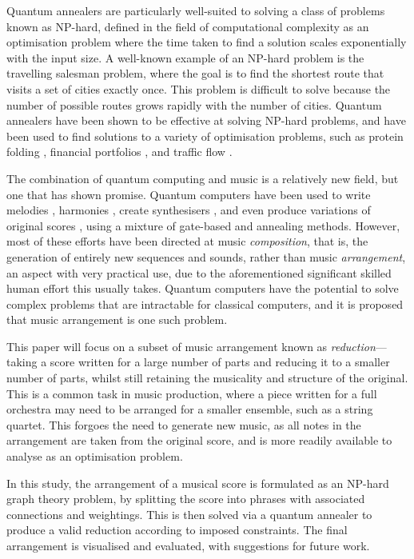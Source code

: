 \documentclass[12pt]{article}
\begin{document}
Quantum annealers are particularly well-suited to solving a class of problems known as NP-hard, defined in the field of computational complexity as an optimisation problem where the time taken to find a solution scales exponentially with the input size. A well-known example of an NP-hard problem is the travelling salesman problem, where the goal is to find the shortest route that visits a set of cities exactly once. This problem is difficult to solve because the number of possible routes grows rapidly with the number of cities. Quantum annealers have been shown to be effective at solving NP-hard problems, and have been used to find solutions to a variety of optimisation problems, such as protein folding , financial portfolios , and traffic flow .

The combination of quantum computing and music is a relatively new field, but one that has shown promise. Quantum computers have been used to write melodies , harmonies , create synthesisers , and even produce variations of original scores , using a mixture of gate-based and annealing methods. However, most of these efforts have been directed at music \textit{composition}, that is, the generation of entirely new sequences and sounds, rather than music \textit{arrangement}, an aspect with very practical use, due to the aforementioned significant skilled human effort this usually takes. Quantum computers have the potential to solve complex problems that are intractable for classical computers, and it is proposed that music arrangement is one such problem.

This paper will focus on a subset of music arrangement known as \textit{reduction}—taking a score written for a large number of parts and reducing it to a smaller number of parts, whilst still retaining the musicality and structure of the original. This is a common task in music production, where a piece written for a full orchestra may need to be arranged for a smaller ensemble, such as a string quartet. This forgoes the need to generate new music, as all notes in the arrangement are taken from the original score, and is more readily available to analyse as an optimisation problem.

In this study, the arrangement of a musical score is formulated as an NP-hard graph theory problem, by splitting the score into phrases with associated connections and weightings. This is then solved via a quantum annealer to produce a valid reduction according to imposed constraints. The final arrangement is visualised and evaluated, with suggestions for future work.
\end{document}

